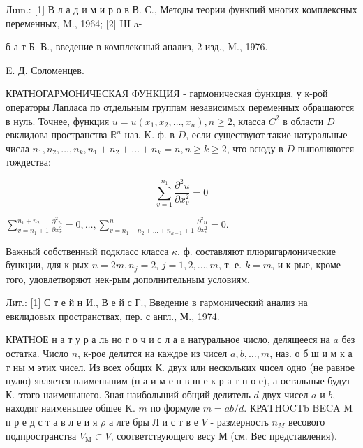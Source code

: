 \documentclass[10pt]{article}
\begin{document}
Лum.: [1] В л а д и м и р о в В. С., Методы теории функпий многих комплексных переменных, M., 1964; [2] III a-

б а т Б. В., введение в комплексный анализ, 2 изд., M., 1976.



E. Д. Соломенцев.



КРАТНОГАРМОНИЧЕСКАЯ ФУНКЦИЯ - гармоническая функция, у к-рой операторы Лапласа по отдельным группам независимых переменных обрашаются в нуль. Точнее, функция $u=u\left(x_{1}, x_{2}, \ldots, x_{n}\right), n \geqslant 2$, класса $C^{2}$ в области $D$ евклидова пространства $\mathbb{R}^{n}$ наз. K. ф. в $D$, если существуют такие натуральные числа $n_{1}, n_{2}, \ldots, n_{k}, n_{1}+n_{2}+\ldots+n_{k}=n, n \geqslant k \geqslant 2$, что всюду в $D$ выполняются тождества:



\[

\sum_{v=1}^{n_{1}} \frac{\partial^{2} u}{\partial x_{v}^{2}}=0

\]



$\sum_{v=n_{1}+1}^{n_{1}+n_{2}} \frac{\partial^{2} u}{\partial x_{v}^{2}}=0, \ldots, \sum_{v=n_{1}+n_{2}+\ldots+n_{k-1}+1}^{n} \frac{\partial^{2} u}{\partial x_{v}^{2}}=0$.



Важный собственный подкласс класса $\kappa$. ф. составляют плюригарлонические бункции, для к-рых $n=2 m, n_{j}=2$, $j=1,2, \ldots, m$, т. е. $k=m$, и к-рые, кроме того, удовлетворяют нек-рым дополнительным условиям.



Лит.: [1] С т е й н И., В е й с Г., Введение в гармонический анализ на евклидовых пространствах, пер. с англ., М., 1974.



КРАТНОЕ н а т у р а ль но г о ч и с л а $а$ натуральное число, делящееся на $a$ без остатка. Число $n$, к-рое делится на каждое из чисел $a, b, \ldots, m$, наз. о б ш и м к а т ны м этих чисел. Из всех общих К. двух или нескольких чисел одно (не равное нулю) является наименьшим (н а и м е н в ш е к р а т н о е), а остальные будут К. этого наименьшего. Зная наибольший общий делитель $d$ двух чисел $a$ и $b$, находят наименьшее обшее $\mathrm{K}$. $m$ по формуле $m=a b / d$. КРАTHOCTb BECA M п р е д с т а в л е и я $\rho$ а лге бры Л и с т в е $V$ - размерность $n_{M}$ весового подпространства $V_{\text {M}} \subset V$, соответствующего весу М (см. Вес представления).
\end{document}
